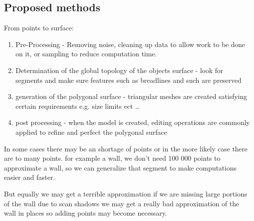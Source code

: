 \subsection{Proposed methods}


From points to surface:

\begin{enumerate}
\item Pre-Processing - Removing noise, cleaning up data to allow work to be done on it, or sampling to reduce computation time.

\item Determination of the global topology of the objects surface - look for segments and make sure features such as breadlines and such are preserved
	
\item generation of the polygonal surface - triangular meshes are created satisfying certain requirements e.g. size limits ect \ldots

\item post processing - when the model is created, editing operations are commonly applied to refine and perfect the polygonal surface
\end{enumerate}

In some cases there may be an shortage of points or in the more likely case there are to many points. for example a wall, we don't need 100 000 points to approximate a wall, so we can generalize that segment to make computations easier and faster.

But equally we may get a terrible approximation if we are missing large portions of the wall due to scan shadows we may get a really bad approximation of the wall in places so adding points may become necessary.




















